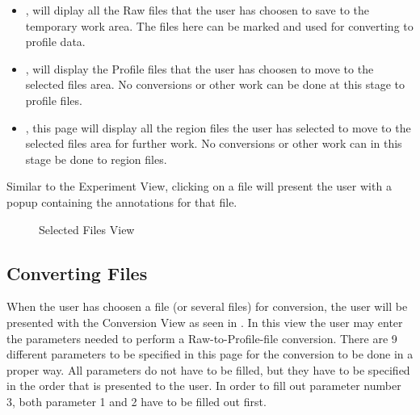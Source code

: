 \begin{itemize}

	\item {}, will diplay all the Raw files that the user has choosen to save to the temporary work area. The files here can be marked and used for converting to profile data.
    \item {}, will display the Profile files that the user has choosen to move to the selected files area. No conversions or other work can be done at this stage to profile files.
    \item {}, this page will display all the region files the user has selected to move to the selected files area for further work. No conversions or other work can in this stage be done to region files.
    
\end{itemize}

Similar to the Experiment View, clicking on a file will present the user with a popup containing the annotations for that file.


\begin{figure}[h]
\caption{Selected Files View}
\label{fig:and_selected_man}
\end{figure}
\FloatBarrier


\subsection{Converting Files}
When the user has choosen a file (or several files) for conversion, the user will be presented with the Conversion View as seen in . In this view the user may enter the parameters needed to perform a Raw-to-Profile-file conversion.
\newline
There are 9 different parameters to be specified in this page for the conversion to be done in a proper way. All parameters do not have to be filled, but they have to be specified in the order that is presented to the user. In order to fill out parameter number 3, both parameter 1 and 2 have to be filled out first.

